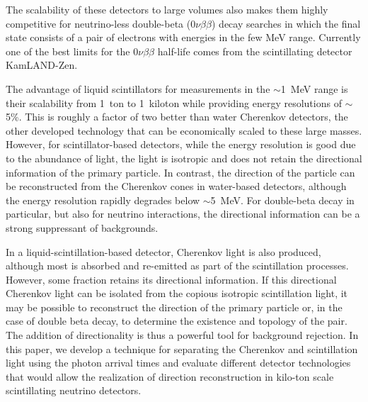 \documentclass[aps,prc,twocolumn,groupedaddress,showpacs,amsmath,amssymb,floatfix,superscriptaddress]{revtex4}
\begin{document}
The scalability of these detectors to large volumes also makes them
highly competitive for neutrino-less double-beta ($0\nu\beta\beta$)
decay searches in which the final state consists of a pair of
electrons with energies in the few MeV range.  Currently one of the
best limits for the $0\nu\beta\beta$ half-life comes from the scintillating detector
KamLAND-Zen\cite{KZ0nu}.

The advantage of liquid scintillators for measurements in the
$\sim$1~MeV range is their scalability from 1~ton to 1~kiloton while
providing energy resolutions of $\sim$5\%. This is roughly a factor of
two better than water Cherenkov detectors, the other developed
technology that can be economically scaled to these large
masses. However, for scintillator-based detectors, while the energy
resolution is good due to the abundance of light, the light is
isotropic and does not retain the directional information of the
primary particle.  In contrast, the direction of the particle can be
reconstructed from the Cherenkov cones in water-based detectors,
although the energy resolution rapidly degrades below $\sim$5~MeV. For
double-beta decay in particular, but also for neutrino interactions,
the directional information can be a strong suppressant of
backgrounds.

In a liquid-scintillation-based detector, Cherenkov light is also
produced, although most is absorbed and re-emitted as part of the
scintillation processes.  However, some fraction retains its
directional information. If this directional Cherenkov light can be
isolated from the copious isotropic scintillation light, it may be
possible to reconstruct the direction of the primary particle or, in
the case of double beta decay, to determine the existence and topology
of the pair.  The addition of directionality is thus a powerful tool
for background rejection.  In this paper, we develop a technique for
separating the Cherenkov and scintillation light using the photon arrival
times and evaluate different detector technologies that would allow
the realization of direction reconstruction in kilo-ton scale
scintillating neutrino detectors.
\end{document}
